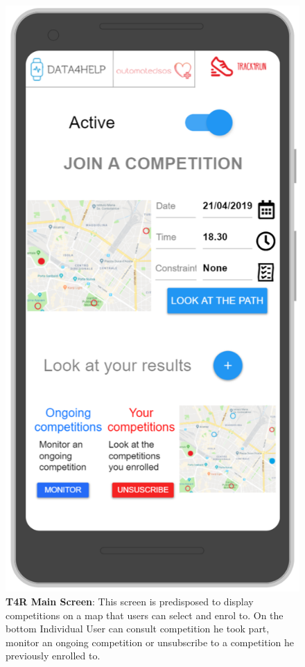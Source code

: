 \begin{figure}[H]
\centering
\includegraphics[scale = 0.5]{Mocks/Mobile_T4R_Main.PNG}
\caption{\textbf{T4R Main Screen}: This screen is predisposed to display competitions on a map that users can select and enrol to. On the bottom Individual User can consult competition he took part, monitor an ongoing competition or unsubscribe to a competition he previously enrolled to. }
\end{figure}


